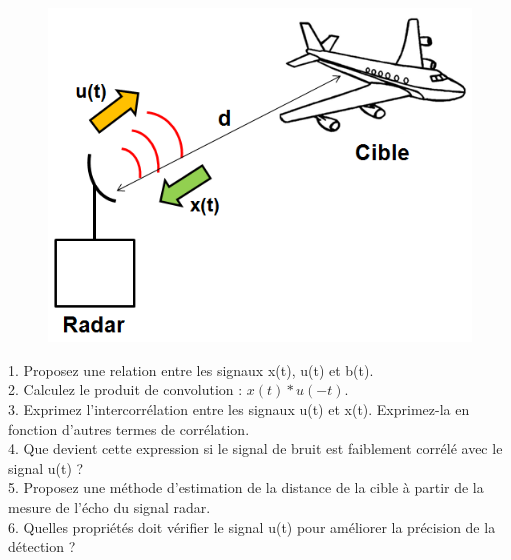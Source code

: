 	\begin{figure}[h!]
		\centering
		\includegraphics[scale=0.5]{images/TD_8_6.png} 
	\end{figure}
	
	1. Proposez une relation entre les signaux x(t), u(t) et b(t).\\
	
	2. Calculez le produit de convolution : $x(t)*u(-t)$.\\
	
	3. Exprimez l'intercorrélation entre les signaux u(t) et x(t). Exprimez-la en fonction d'autres termes de corrélation.\\
	
	4. Que devient cette expression si le signal de bruit est faiblement corrélé avec le signal u(t) ?\\
	
	5. Proposez une méthode d'estimation de la distance de la cible à partir de la mesure de l'écho du signal radar.\\
	
	6. Quelles propriétés doit vérifier le signal u(t) pour améliorer la précision de la détection ?
	
	
	